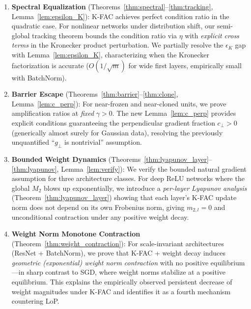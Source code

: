 \documentclass{article}
\theoremstyle{plain}
\theoremstyle{definition}
\theoremstyle{remark}
\begin{document}
\begin{enumerate}
    \item \textbf{Spectral Equalization} (Theorems~\ref{thm:spectral}--\ref{thm:tracking}, Lemma~\ref{lem:epsilon_K}): K-FAC achieves perfect condition ratio in the quadratic case. For nonlinear networks under distribution shift, our semi-global tracking theorem bounds the condition ratio via $\eta$ with \emph{explicit cross terms} in the Kronecker product perturbation. We partially resolve the $\epsilon_K$ gap with Lemma~\ref{lem:epsilon_K}, characterizing when the Kronecker factorization is accurate ($O(1/\sqrt{m})$ for wide first layers, empirically small with BatchNorm).
    
    \item \textbf{Barrier Escape} (Theorems~\ref{thm:barrier}--\ref{thm:clone}, Lemma~\ref{lem:c_perp}): For near-frozen and near-cloned units, we prove amplification ratios at \emph{fixed} $\gamma > 0$. The new Lemma~\ref{lem:c_perp} provides explicit conditions guaranteeing the perpendicular gradient fraction $c_\perp > 0$ (generically almost surely for Gaussian data), resolving the previously unquantified ``$g_\perp$ is nontrivial'' assumption.
    
    \item \textbf{Bounded Weight Dynamics} (Theorems~\ref{thm:lyapunov_layer}--\ref{thm:lyapunov}, Lemma~\ref{lem:verify}): We verify the bounded natural gradient assumption for three architecture classes. For deep ReLU networks where the global $M_2$ blows up exponentially, we introduce a \emph{per-layer Lyapunov analysis} (Theorem~\ref{thm:lyapunov_layer}) showing that each layer's K-FAC update norm does not depend on its own Frobenius norm, giving $m_{2,l} = 0$ and unconditional contraction under any positive weight decay.
    
    \item \textbf{Weight Norm Monotone Contraction} (Theorem~\ref{thm:weight_contraction}): For scale-invariant architectures (ResNet + BatchNorm), we prove that K-FAC + weight decay induces \emph{geometric (exponential) weight norm contraction} with no positive equilibrium---in sharp contrast to SGD, where weight norms stabilize at a positive equilibrium. This explains the empirically observed persistent decrease of weight magnitudes under K-FAC and identifies it as a fourth mechanism countering LoP.


\end{enumerate}
\end{document}
